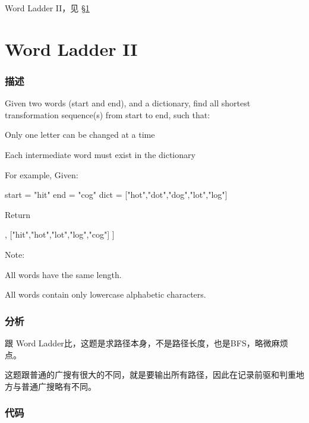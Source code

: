 \begindot
\item Word Ladder II，见 \S \ref{sec:word-ladder-ii}
\myenddot


\section{Word Ladder II} %
\label{sec:word-ladder-ii}


\subsubsection{描述}
Given two words (start and end), and a dictionary, find all shortest transformation sequence(s) from start to end, such that:
\begindot
\item Only one letter can be changed at a time
\item Each intermediate word must exist in the dictionary
\myenddot

For example, Given:
\begin{Code}
start = "hit"
end = "cog"
dict = ["hot","dot","dog","lot","log"]
\end{Code}
Return
\begin{Code}
[
    ["hit","hot","dot","dog","cog"],
    ["hit","hot","lot","log","cog"]
]
\end{Code}

Note:
\begindot
\item All words have the same length.
\item All words contain only lowercase alphabetic characters.
\myenddot


\subsubsection{分析}
跟 Word Ladder比，这题是求路径本身，不是路径长度，也是BFS，略微麻烦点。

这题跟普通的广搜有很大的不同，就是要输出所有路径，因此在记录前驱和判重地方与普通广搜略有不同。


\subsubsection{代码}

